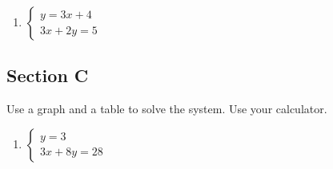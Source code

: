 \documentclass{article}
\begin{document}


\begin{enumerate}
\item $\begin{cases}
	y=3x+4 \\ 3x+2y=5
\end{cases}$
\begin{figure}[h!]
\end{figure}
\end{enumerate}

\subsection*{Section C}
Use a graph and a table to solve the system.  Use your calculator.
\begin{enumerate}
\item
	$
  \begin{cases}
    	y=3 \\
      	3x+8y=28
  \end{cases}
	$
\end{enumerate}
\end{document}
